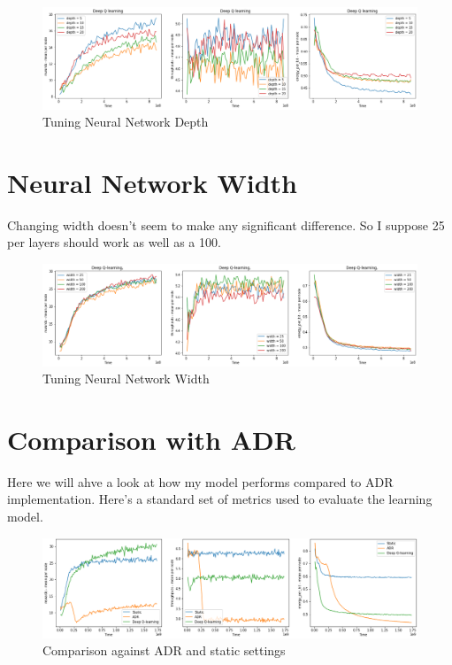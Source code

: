\begin{figure}[H]
\centering
\hspace*{-1.3cm}  
\includegraphics[scale=0.40]{plots/depth/depth_deep_q_SMALL.png}
  \caption{Tuning Neural Network Depth}
\end{figure}

\section{Neural Network Width}

Changing width doesn't seem to make any significant difference. So I suppose 
25 per layers should work as well as a 100. 

\begin{figure}[H]
\centering
\hspace*{-1.3cm}  
\includegraphics[scale=0.40]{plots/width/width_small.png}
  \caption{Tuning Neural Network Width}
\end{figure}

\section{Comparison with ADR}

Here we will ahve a look at how my model performs
compared to ADR implementation. Here's a standard 
set of metrics used to evaluate the learning model.

\begin{figure}[H]
\centering
\hspace*{-0.5cm}  
\includegraphics[scale=0.40]{plots/adr/adr_smaller.png}
  \caption{Comparison against ADR and static settings}
  \label{fig:adr_against_deep}
\end{figure}

